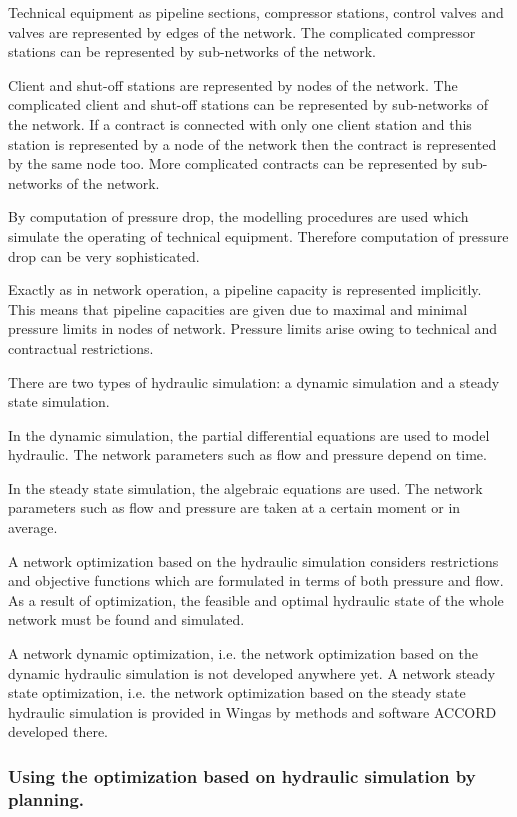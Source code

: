 \documentclass{article}
\begin{document}
Technical equipment as pipeline sections, compressor stations, control
valves and valves are represented by edges of the network. The complicated
compressor stations can be represented by sub-networks of the network.

Client and shut-off stations are represented by nodes of the network. The
complicated client and shut-off stations can be represented by sub-networks
of the network. If a contract is connected with only one client station and
this station is represented by a node of the network then the contract is
represented by the same node too. More complicated contracts can be
represented by sub-networks of the network.

By computation of pressure drop, the modelling procedures are used which
simulate the operating of technical equipment. Therefore computation of
pressure drop can be very sophisticated.

Exactly as in network operation, a pipeline capacity is represented
implicitly. This means that pipeline capacities are given due to maximal and
minimal pressure limits in nodes of network. Pressure limits arise owing to
technical and contractual restrictions.

There are two types of hydraulic simulation: a dynamic simulation and a
steady state simulation.

In the dynamic simulation, the partial differential equations are used to
model hydraulic. The network parameters such as flow and pressure depend on
time.

In the steady state simulation, the algebraic equations are used. The
network parameters such as flow and pressure are taken at a certain moment
or in average.

A network optimization based on the hydraulic simulation considers
restrictions and objective functions which are formulated in terms of both
pressure and flow. As a result of optimization, the feasible and optimal
hydraulic state of the whole network must be found and simulated.

A network dynamic optimization, i.e. the network optimization based on the
dynamic hydraulic simulation is not developed anywhere yet. A network steady
state optimization, i.e. the network optimization based on the steady state
hydraulic simulation is provided in Wingas by methods and software ACCORD
developed there.

\subsubsection{Using the optimization based on hydraulic simulation by
planning.}
\end{document}
